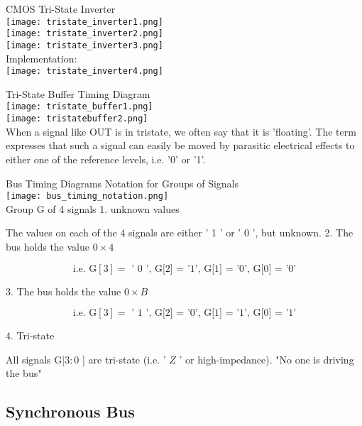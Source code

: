 \begin{definition}{CMOS Tri-State Inverter}\\
    \texttt{[image: tristate\_inverter1.png]}\\
    \texttt{[image: tristate\_inverter2.png]}\\
    \texttt{[image: tristate\_inverter3.png]}\\
    Implementation:\\
    \texttt{[image: tristate\_inverter4.png]}
\end{definition}

\begin{concept}{Tri-State Buffer} Timing Diagram\\
    \texttt{[image: tristate\_buffer1.png]}\\
    \texttt{[image: tristatebuffer2.png]}\\
    When a signal like OUT is in tristate, we often say that it is 'floating'. 
    The term expresses that such a signal can easily be moved by parasitic electrical effects
    to either one of the reference levels, i.e. '0' or '1'.
\end{concept}

\begin{theorem}{Bus Timing Diagrams} Notation for Groups of Signals\\
    \texttt{[image: bus\_timing\_notation.png]}\\
    Group G of 4 signals
1. unknown values

The values on each of the 4 signals are either ' 1 ' or ' 0 ', but unknown.
2. The bus holds the value $0 \times 4$

$$
\text { i.e. } \mathrm{G}[3]=\text { ' } 0 \text { ', G[2] = '1', G[1] = '0', G[0] = '0' }
$$

3. The bus holds the value $0 \times B$

$$
\text { i.e. } \mathrm{G}[3]=\text { ' } 1 \text { ', G[2] = '0', G[1] = '1', G[0] = '1' }
$$

4. Tri-state

All signals $\mathrm{G}[3: 0$ ] are tri-state (i.e. ' $Z$ ' or high-impedance). "No one is driving the bus"
\end{theorem}

\subsection{Synchronous Bus}

